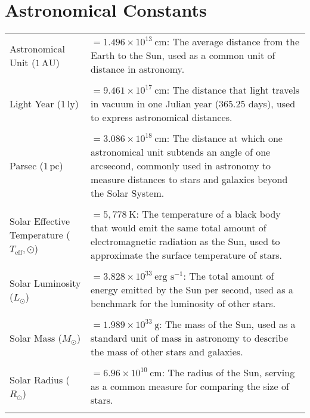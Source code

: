 \documentclass[main.tex]{subfiles}
\begin{document}
\section*{Astronomical Constants}
\begin{longtable}{p{} p{}}
    Astronomical Unit ($1\,\text{AU}$) & $= 1.496 \times 10^{13}\ \text{cm}$: The average distance from the Earth to the Sun, used as a common unit of distance in astronomy. \\\\
    Light Year ($1\,\text{ly}$) & $= 9.461 \times 10^{17}\ \text{cm}$: The distance that light travels in vacuum in one Julian year (365.25 days), used to express astronomical distances. \\\\
    Parsec ($1\,\text{pc}$) & $= 3.086 \times 10^{18}\ \text{cm}$: The distance at which one astronomical unit subtends an angle of one arcsecond, commonly used in astronomy to measure distances to stars and galaxies beyond the Solar System. \\\\
    Solar Effective Temperature ($T_\mathrm{eff},\odot$) & $= 5,778\ \text{K}$: The temperature of a black body that would emit the same total amount of electromagnetic radiation as the Sun, used to approximate the surface temperature of stars. \\\\
    Solar Luminosity ($L_{\odot}$) & $= 3.828 \times 10^{33}\ \text{erg s}^{-1}$: The total amount of energy emitted by the Sun per second, used as a benchmark for the luminosity of other stars. \\\\
    Solar Mass ($M_{\odot}$) & $= 1.989 \times 10^{33}\ \text{g}$: The mass of the Sun, used as a standard unit of mass in astronomy to describe the mass of other stars and galaxies. \\\\
    Solar Radius ($R_{\odot}$) & $= 6.96 \times 10^{10}\ \text{cm}$: The radius of the Sun, serving as a common measure for comparing the size of stars. \\\\
\end{longtable}


\end{document}
